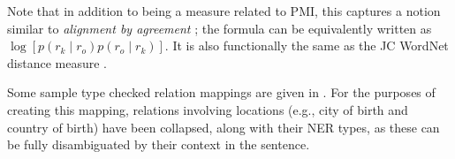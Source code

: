 Note that in addition to being a measure related to PMI, this captures
  a notion similar to \textit{alignment by agreement} 
  \cite{key:2006liang-alignment};
  the formula can be equivalently written as 
  $\log \left[ p(r_k \mid r_o) p(r_o \mid r_k)\right]$.
It is also functionally the same as the JC WordNet distance measure
  \cite{key:1997jc-similarity}.

Some sample type checked relation mappings are given in .
For the purposes of creating this mapping, relations involving
  locations (e.g., city of birth and country of birth) have been collapsed,
  along with their NER types, as these can be fully disambiguated by their
  context in the sentence.
  


